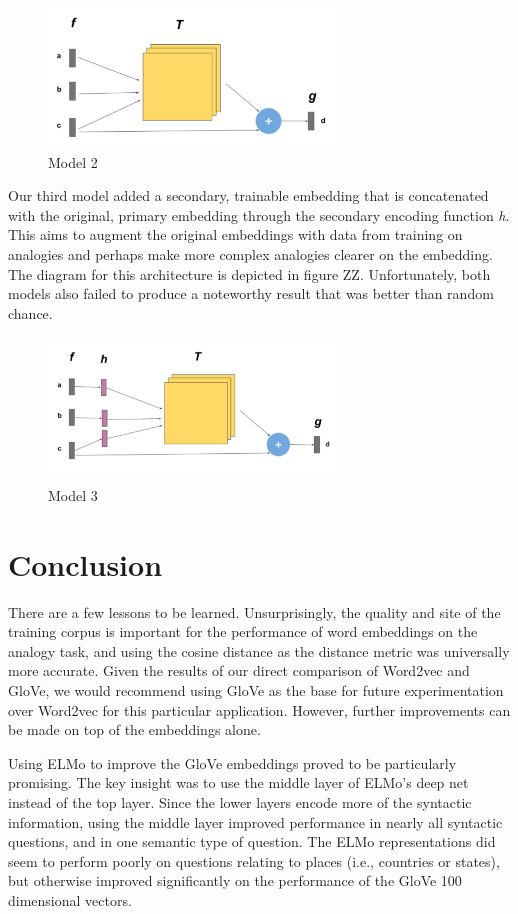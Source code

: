 \documentclass[11pt]{article}
\begin{document}
\begin{figure}
  \centering
\includegraphics[width=3.0in,height=1.5in]{./model_2.png}
  \caption{Model 2}
\end{figure}

Our third model added a secondary, trainable embedding that is
concatenated with the original, primary embedding through the secondary
encoding function \emph{h}. This aims to augment the original embeddings
with data from training on analogies and perhaps make more complex
analogies clearer on the embedding. The diagram for this architecture is
depicted in figure ZZ. Unfortunately, both models also failed to produce
a noteworthy result that was better than random chance.

\begin{figure}
  \centering
\includegraphics[width=3.0in,height=1.5in]{./model_3.png}
  \caption{Model 3}
\end{figure}

\section{Conclusion}

There are a few lessons to be learned. Unsurprisingly, the quality and
site of the training corpus is important for the performance of word
embeddings on the analogy task, and using the cosine distance as the
distance metric was universally more accurate. Given the results of our
direct comparison of Word2vec and GloVe, we would recommend using GloVe
as the base for future experimentation over Word2vec for this particular
application. However, further improvements can be made on top of the
embeddings alone.

Using ELMo to improve the GloVe embeddings proved to be particularly
promising. The key insight was to use the middle layer of ELMo's deep
net instead of the top layer. Since the lower layers encode more of the
syntactic information, using the middle layer improved performance in
nearly all syntactic questions, and in one semantic type of question.
The ELMo representations did seem to perform poorly on questions
relating to places (i.e., countries or states), but otherwise improved
significantly on the performance of the GloVe 100 dimensional vectors.
\end{document}
